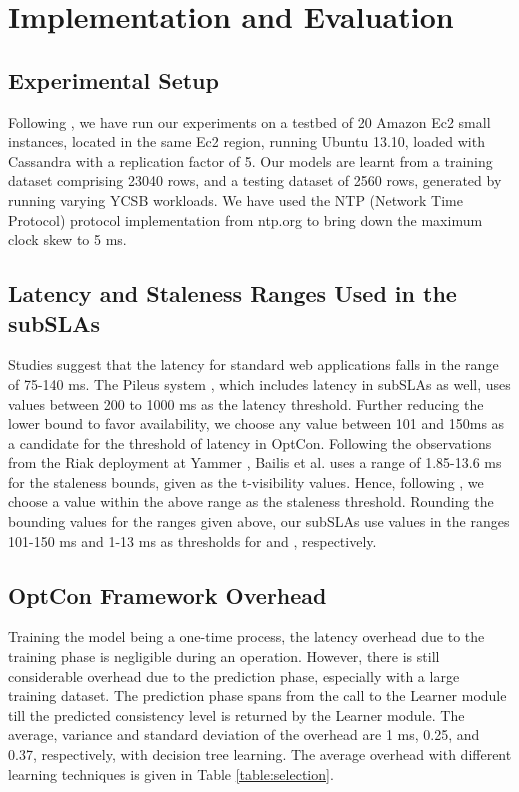 \documentclass[conference]{IEEEtran}
\begin{document}
\section{Implementation and Evaluation}\label{sec:eval}

\subsection{Experimental Setup}\label{sec:setup}
Following \cite{DBLP:conf/cloud/GolabRAKWG13}, we have run our experiments on a testbed of 20 Amazon Ec2 small
instances, located in the same Ec2 region, running Ubuntu 13.10, loaded with Cassandra with a replication factor of 5.  Our models are learnt from a training dataset comprising 23040 rows, and a testing dataset of 2560 rows, generated by running varying YCSB \cite{Cooper:2010:BCS:1807128.1807152} workloads.
We have used the NTP (Network Time Protocol) protocol implementation from ntp.org to bring down the maximum clock skew to 5 ms. 
\subsection{Latency and Staleness Ranges Used in the subSLAs}\label{sec:experimental}
 Studies \cite{Everts:2012:Online}
         suggest that
 the latency for standard web applications falls in the range of 75-140 ms. The Pileus system
\cite{Terry:2013:CSL:2517349.2522731}, which includes latency in subSLAs as well, uses values between  200 to 1000 ms as the latency
threshold. Further reducing the lower bound to favor availability, we choose any value between 101 and 150ms as a candidate for the threshold of latency in OptCon. Following the observations from the Riak deployment at Yammer \cite{YMMRRiak}, Bailis et al. \cite{Bailis:2012:PBS:2212351.2212359} uses a range of 1.85-13.6 ms for the staleness bounds, given as the
        t-visibility values. Hence, following \cite{Bailis:2012:PBS:2212351.2212359}, we choose a value within the above range as the staleness threshold. Rounding the bounding values for the ranges given above, our subSLAs use values in the ranges  101-150 ms and 1-13 ms as thresholds for  and , respectively.

\subsection{OptCon Framework Overhead}\label{sec:over}
Training the model being a one-time process, the latency overhead due to the training phase is negligible during an operation. However, there is still considerable overhead due to the prediction phase, especially with a large training dataset. The  prediction phase spans from the call to the Learner module till the predicted consistency level is returned by the Learner module. The average, variance and standard deviation of the overhead are 1 ms, 0.25, and 0.37, respectively, with decision tree learning. The average overhead with
         different learning techniques is given in Table \ref{table:selection}.
\end{document}
